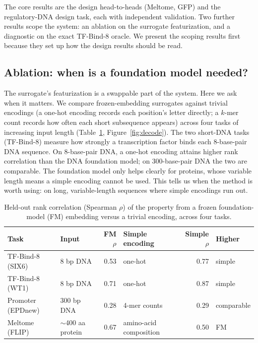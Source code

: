 \documentclass{article}
\begin{document}
The core results are the design head-to-heads (Meltome, GFP) and the regulatory-DNA design
task, each with independent validation. Two further results scope the system: an ablation on
the surrogate featurization, and a diagnostic on the exact TF-Bind-8 oracle. We present the
scoping results first because they set up how the design results should be read.

\subsection{Ablation: when is a foundation model needed?}

The surrogate's featurization is a swappable part of the system. Here we ask when it matters.
We compare frozen-embedding surrogates against trivial encodings (a one-hot encoding
records each position's letter directly; a $k$-mer count records how often each short
subsequence appears) across four tasks of increasing input length (Table~\ref{tab:decode},
Figure~\ref{fig:decode}). The two short-DNA tasks (TF-Bind-8) measure how strongly a
transcription factor binds each 8-base-pair DNA sequence. On 8-base-pair DNA, a one-hot
encoding attains higher rank
correlation than the DNA foundation model; on 300-base-pair DNA the two are comparable.
The foundation model only helps clearly for proteins, whose variable length means a simple
encoding cannot be used. This tells us when the method is worth using: on long,
variable-length sequences where simple encodings run out.

\begin{table}[t]
\centering\small
\caption{Held-out rank correlation (Spearman $\rho$) of the property from a frozen
foundation-model (FM) embedding versus a trivial encoding, across four tasks.}
\label{tab:decode}
\begin{tabular}{llrlrl}
\toprule
Task & Input & FM $\rho$ & Simple encoding & Simple $\rho$ & Higher \\
\midrule
TF-Bind-8 (SIX6) & 8 bp DNA & 0.53 & one-hot & 0.77 & simple \\
TF-Bind-8 (WT1)  & 8 bp DNA & 0.71 & one-hot & 0.87 & simple \\
Promoter (EPDnew) & 300 bp DNA & 0.28 & 4-mer counts & 0.29 & comparable \\
Meltome (FLIP) & $\sim$400 aa protein & 0.67 & amino-acid composition & 0.50 & FM \\
\bottomrule
\end{tabular}
\end{table}
\end{document}
